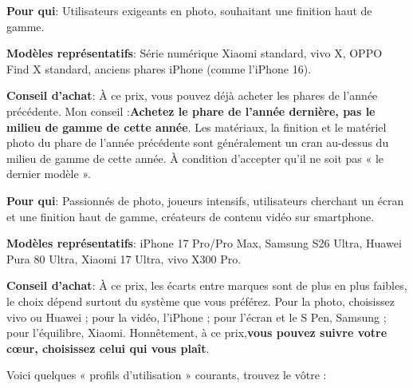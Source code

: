 
\textbf{Pour qui}: Utilisateurs exigeants en photo, souhaitant une finition haut de gamme.

\textbf{Modèles représentatifs}: Série numérique Xiaomi standard, vivo X, OPPO Find X standard, anciens phares iPhone (comme l'iPhone 16).

\textbf{Conseil d'achat}: À ce prix, vous pouvez déjà acheter les phares de l'année précédente. Mon conseil :\textbf{Achetez le phare de l'année dernière, pas le milieu de gamme de cette année}. Les matériaux, la finition et le matériel photo du phare de l'année précédente sont généralement un cran au-dessus du milieu de gamme de cette année. À condition d'accepter qu'il ne soit pas « le dernier modèle ».


\textbf{Pour qui}: Passionnés de photo, joueurs intensifs, utilisateurs cherchant un écran et une finition haut de gamme, créateurs de contenu vidéo sur smartphone.

\textbf{Modèles représentatifs}: iPhone 17 Pro/Pro Max, Samsung S26 Ultra, Huawei Pura 80 Ultra, Xiaomi 17 Ultra, vivo X300 Pro.

\textbf{Conseil d'achat}: À ce prix, les écarts entre marques sont de plus en plus faibles, le choix dépend surtout du système que vous préférez. Pour la photo, choisissez vivo ou Huawei ; pour la vidéo, l'iPhone ; pour l'écran et le S Pen, Samsung ; pour l'équilibre, Xiaomi. Honnêtement, à ce prix,\textbf{vous pouvez suivre votre cœur, choisissez celui qui vous plaît}.


Voici quelques « profils d'utilisation » courants, trouvez le vôtre :


